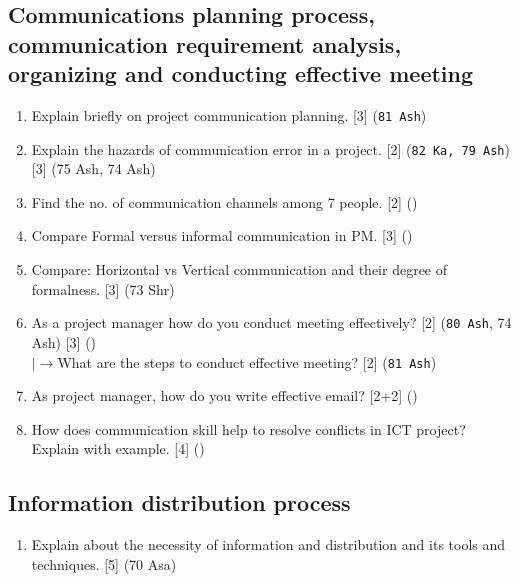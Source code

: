 \documentclass[12pt]{article}
\newcommand{\lb}{\\$\left|\rightarrow\right.$}
\begin{document}
  \subsection{Communications planning process, communication requirement analysis, organizing and conducting effective meeting}
    \begin{enumerate}
      \item Explain briefly on project communication planning. \hfill [3] (\texttt{81 Ash})

      \item Explain the hazards of communication error in a project. \hfill [2] (\texttt{82 Ka, 79 Ash}) [3] (75 Ash, 74 Ash)

      \item Find the no. of communication channels among 7 people. \hfill [2] ()

      \item Compare Formal versus informal communication in PM. \hfill [3] ()

      \item Compare: Horizontal vs Vertical communication and their degree of formalness. \hfill [3] (73 Shr)

      \item As a project manager how do you conduct meeting effectively? \hfill [2] (\texttt{80 Ash}, 74 Ash) [3] ()
        \lb What are the steps to conduct effective meeting? \hfill [2] (\texttt{81 Ash})

      \item As project manager, how do you write effective email? \hfill [2+2] ()

      \item How does communication skill help to resolve conflicts in ICT project? Explain with example. \hfill [4] ()
    \end{enumerate}

  \subsection{Information distribution process}
    \begin{enumerate}
      \item Explain about the necessity of information and distribution and its tools and techniques. \hfill [5] (70 Asa)
    \end{enumerate}
\end{document}
